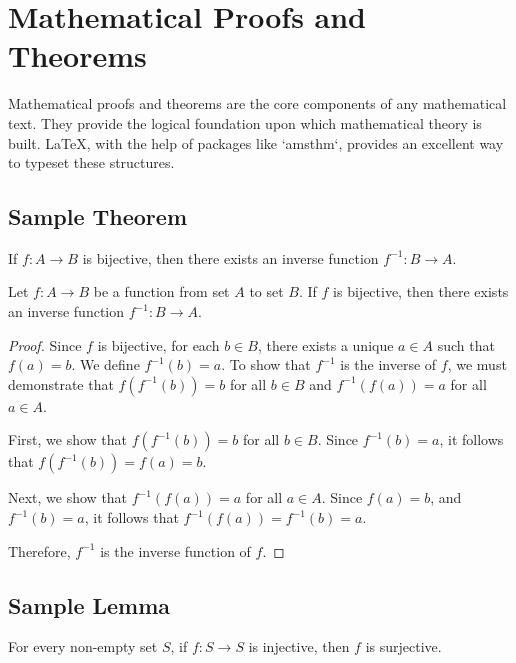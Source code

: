 \section{Mathematical Proofs and Theorems}

Mathematical proofs and theorems are the core components of any mathematical text. They provide the logical foundation upon which mathematical theory is built. LaTeX, with the help of packages like `amsthm`, provides an excellent way to typeset these structures.

\subsection{Sample Theorem}
\begin{boxedtheorem}
If \( f: A \to B \) is bijective, then there exists an inverse function \( f^{-1}: B \to A \).
\end{boxedtheorem}
\begin{theorem}
Let \( f: A \to B \) be a function from set \( A \) to set \( B \). If \( f \) is bijective, then there exists an inverse function \( f^{-1}: B \to A \).
\end{theorem}

\begin{proof}
Since \( f \) is bijective, for each \( b \in B \), there exists a unique \( a \in A \) such that \( f(a) = b \). We define \( f^{-1}(b) = a \). To show that \( f^{-1} \) is the inverse of \( f \), we must demonstrate that \( f(f^{-1}(b)) = b \) for all \( b \in B \) and \( f^{-1}(f(a)) = a \) for all \( a \in A \).

First, we show that \( f(f^{-1}(b)) = b \) for all \( b \in B \). Since \( f^{-1}(b) = a \), it follows that \( f(f^{-1}(b)) = f(a) = b \).

Next, we show that \( f^{-1}(f(a)) = a \) for all \( a \in A \). Since \( f(a) = b \), and \( f^{-1}(b) = a \), it follows that \( f^{-1}(f(a)) = f^{-1}(b) = a \).

Therefore, \( f^{-1} \) is the inverse function of \( f \).
\end{proof}

\subsection{Sample Lemma}
\begin{lemma}
For every non-empty set \( S \), if \( f: S \to S \) is injective, then \( f \) is surjective.
\end{lemma}

